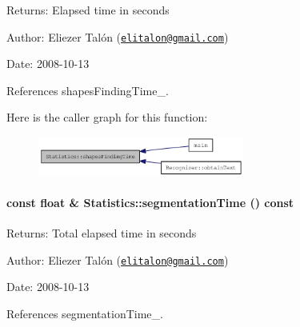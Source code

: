 \begin{Desc}
\item[Returns:]Elapsed time in seconds\end{Desc}
\begin{Desc}
\item[Author:]Eliezer Talón (\href{mailto:elitalon@gmail.com}{\tt elitalon@gmail.com}) \end{Desc}
\begin{Desc}
\item[Date:]2008-10-13 \end{Desc}


References shapesFindingTime\_\-.

Here is the caller graph for this function:\nopagebreak
\begin{figure}[H]
\begin{center}
\leavevmode
\includegraphics[width=192pt]{class_statistics_cdb8852bc99d12a619d130ae2e6948ee_icgraph}
\end{center}
\end{figure}
\hypertarget{class_statistics_4cea19c3705fc315ce2b4300b3725ab8}{
\paragraph[segmentationTime]{\setlength{\rightskip}{0pt plus 5cm}const float \& Statistics::segmentationTime () const}\hfill}
\label{class_statistics_4cea19c3705fc315ce2b4300b3725ab8}


\begin{Desc}
\item[Returns:]Total elapsed time in seconds\end{Desc}
\begin{Desc}
\item[Author:]Eliezer Talón (\href{mailto:elitalon@gmail.com}{\tt elitalon@gmail.com}) \end{Desc}
\begin{Desc}
\item[Date:]2008-10-13 \end{Desc}


References segmentationTime\_\-.


